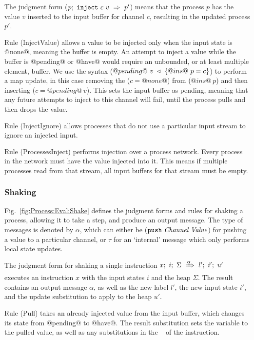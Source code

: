 The judgment form ($\ProcInject{p}{c}{v}{p'}$) means that the process $p$ has the value $v$ inserted to the input buffer for channel $c$, resulting in the updated process $p'$.

Rule (InjectValue) allows a value to be injected only when the input state is @none@, meaning the buffer is empty.
An attempt to inject a value while the buffer is @pending@ or @have@ would require an unbounded, or at least multiple element, buffer.
We use the syntax ($\HeapUpdateOne{@ins@~p}{c}{@pending@~v}$) to perform a map update, in this case removing the ($c=@none@$) from ($@ins@~p$) and then inserting ($c=@pending@~v$).
This sets the input buffer as pending, meaning that any future attempts to inject to this channel will fail, until the process pulls and then drops the value.

Rule (InjectIgnore) allows processes that do not use a particular input stream to ignore an injected input.

Rule (ProcessesInject) performs injection over a process network.
Every process in the network must have the value injected into it.
This means if multiple processes read from that stream, all input buffers for that stream must be empty.

\subsubsection{Shaking}
Fig.~\ref{fig:Process:Eval:Shake} defines the judgment forms and rules for shaking a process, allowing it to take a step, and produce an output message.
The type of messages is denoted by $\alpha$, which can either be ($\Push~\Chan~\Value$) for pushing a value to a particular channel, or $\tau$ for an `internal' message which only performs local state updates.


The judgment form for shaking a single instruction $\ProcBlockShake{x}{i}{\Sigma}{\alpha}{l'}{i'}{u'}$
executes an instruction $x$ with the input states $i$ and the heap $\Sigma$.
The result contains an output message $\alpha$, as well as the new label $l'$, the new input state $i'$, and the update substitution to apply to the heap $u'$.

Rule (Pull) takes an already injected value from the input buffer, which changes its state from @pending@ to @have@.
The result substitution sets the variable to the pulled value, as well as any substitutions in the \Next~ of the instruction.

